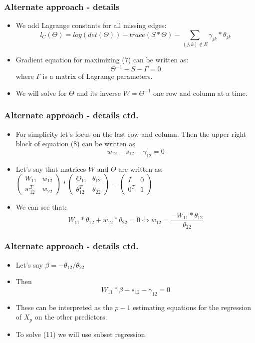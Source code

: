\documentclass{beamer}
\begin{document}
\begin{frame}
\frametitle{Alternate approach - details}
\begin{itemize}
\item We add Lagrange constants for all missing edges:
\begin{equation}
l_C(\Theta)=log(det(\Theta))-trace(S*\Theta)-\sum_{(j, k)\notin E}{\gamma_{jk}*\theta_{jk}}
\end{equation}
\item Gradient equation for maximizing (7) can be written as:
\begin{equation}
\Theta^{-1} - S - \Gamma = 0
\end{equation}
where $\Gamma$ is a matrix of Lagrange parameters.
\item We will solve for $\Theta$ and its inverse $W = \Theta^{-1}$ one row and column at a time.
\end{itemize}
\end{frame}
\begin{frame}
\frametitle{Alternate approach - details ctd.}
\begin{itemize}
\item For simplicity let’s focus on the
last row and column. Then the upper right block of equation (8) can be written as
\begin{equation}
w_{12}-s_{12}-\gamma_{12}=0
\end{equation}
\item Let's say that matrices $W$ and $\Theta$ are written as:
$\begin{pmatrix}
W_{11} & w_{12}\\
w_{12}^T & w_{22}
\end{pmatrix} * \begin{pmatrix}
\Theta_{11} & \theta_{12}\\
\theta_{12}^T & \theta_{22} 
\end{pmatrix} = \begin{pmatrix}
I & 0\\
0^T & 1 
\end{pmatrix}$ 
\item We can see that:
\begin{equation}
W_{11} * \theta_{12} + w_{12}*\theta_{22}=0 \iff w_{12}=\frac{-W_{11}*\theta_{12}}{\theta_{22}}
\end{equation}
\end{itemize}
\end{frame}

\begin{frame}
\frametitle{Alternate approach - details ctd.}
\begin{itemize}
\item Let's say $\beta = −\theta_{12} / \theta_{22}$
\item Then 
\begin{equation}
W_{11}*\beta-s_{12}-\gamma_{12} = 0
\end{equation}
\item These can be interpreted as the $p - 1$ estimating equations for the regression of $X_p$ on the other predictors.
\item To solve (11) we will use subset regression.
\end{itemize}
\end{frame}
\end{document}
